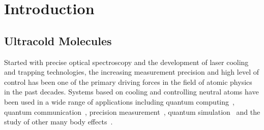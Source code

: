 
\chapter{Introduction}
\label{ch:introduction}

\section{Ultracold Molecules}
\label{ch:introduction:molecules}

Started with precise optical spectroscopy and the development of laser cooling
and trapping technologies, the increasing measurement precision and
high level of control has been one of the primary driving forces
in the field of atomic physics in the past decades.
Systems based on cooling and controlling neutral atoms
have been used in a wide range of applications including
quantum computing~\cite{wang_single-qubit_2016,anderlini_controlled_2007,
  kaufman_entangling_2015,levine_high-fidelity_2018,isenhower_demonstration_2010},
quantum communication~\cite{tiecke_nanophotonic_2014,reiserer_quantum_2014,
  welte_photon-mediated_2018},
precision measurement~\cite{bloom_optical_2014,parker_measurement_2018},
quantum simulation~\cite{bakr_quantum_2009,cheuk_quantum-gas_2015,bernien_probing_2017,
  leseleuc_observation_2019,koepsell_imaging_2019,chiu_string_2019,
  bloch_many-body_2008,lahaye_physics_2009}
and the study of other many body effects~\cite{weiner_experiments_1999,
  sompet_thermally_2019,xu_interaction-induced_2015,guan_density_2019,
  dimitrova_observation_2017}.

